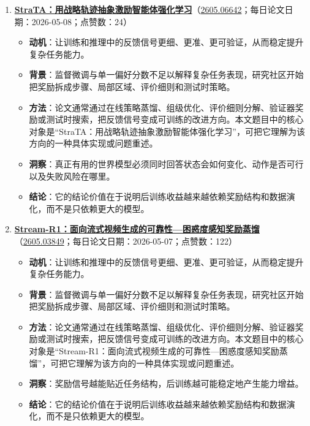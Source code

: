 \begin{enumerate}[leftmargin=1.5em]
\begin{itemize}[leftmargin=1.5em]
    \item \textbf{结论}：它的结论价值在于说明后训练收益越来越依赖奖励结构和数据演化，而不是只依赖更大的模型。
  \end{itemize}
  \item \textbf{\href{https://huggingface.co/papers/2605.06642}{StraTA：用战略轨迹抽象激励智能体强化学习}}（\href{https://arxiv.org/abs/2605.06642}{2605.06642}；每日论文日期：2026-05-08；点赞数：24）
  \begin{itemize}[leftmargin=1.5em]
    \item \textbf{动机}：让训练和推理中的反馈信号更细、更准、更可验证，从而稳定提升复杂任务能力。
    \item \textbf{背景}：监督微调与单一偏好分数不足以解释复杂任务表现，研究社区开始把奖励拆成步骤、局部区域、评价细则和测试时策略。
    \item \textbf{方法}：论文通常通过在线策略蒸馏、组级优化、评价细则分解、验证器奖励或测试时搜索，把反馈信号变成可训练的改进方向。本文题目中的核心对象是“StraTA：用战略轨迹抽象激励智能体强化学习”，可把它理解为该方向的一种具体实现或问题重述。
    \item \textbf{洞察}：真正有用的世界模型必须同时回答状态会如何变化、动作是否可行以及失败风险在哪里。
    \item \textbf{结论}：它的结论价值在于说明后训练收益越来越依赖奖励结构和数据演化，而不是只依赖更大的模型。
  \end{itemize}
  \item \textbf{\href{https://huggingface.co/papers/2605.03849}{Stream-R1：面向流式视频生成的可靠性—困惑度感知奖励蒸馏}}（\href{https://arxiv.org/abs/2605.03849}{2605.03849}；每日论文日期：2026-05-07；点赞数：122）
  \begin{itemize}[leftmargin=1.5em]
    \item \textbf{动机}：让训练和推理中的反馈信号更细、更准、更可验证，从而稳定提升复杂任务能力。
    \item \textbf{背景}：监督微调与单一偏好分数不足以解释复杂任务表现，研究社区开始把奖励拆成步骤、局部区域、评价细则和测试时策略。
    \item \textbf{方法}：论文通常通过在线策略蒸馏、组级优化、评价细则分解、验证器奖励或测试时搜索，把反馈信号变成可训练的改进方向。本文题目中的核心对象是“Stream-R1：面向流式视频生成的可靠性—困惑度感知奖励蒸馏”，可把它理解为该方向的一种具体实现或问题重述。
    \item \textbf{洞察}：奖励信号越能贴近任务结构，后训练越可能稳定地产生能力增益。
    \item \textbf{结论}：它的结论价值在于说明后训练收益越来越依赖奖励结构和数据演化，而不是只依赖更大的模型。

\end{itemize}
\end{enumerate}
